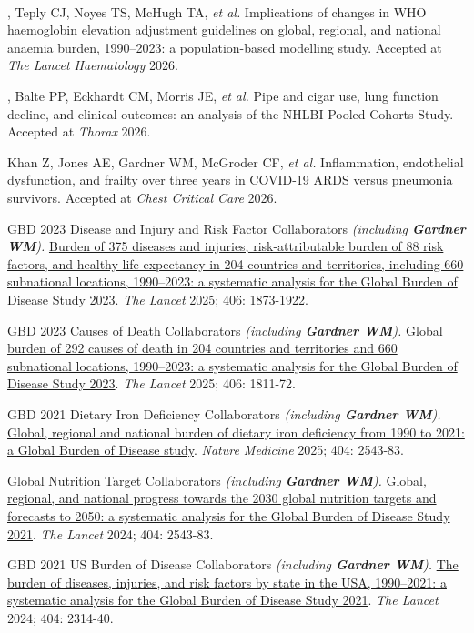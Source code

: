 \documentclass[11pt,article,oneside]{memoir}
\begin{document}
\textsuperscript{\textdagger}, Teply CJ\textsuperscript{\textdagger}, Noyes TS, McHugh TA, \emph{et al.} Implications of changes in WHO haemoglobin elevation adjustment guidelines on global, regional, and national 
anaemia burden, 1990–2023: a population-based modelling study. Accepted at \emph{The Lancet Haematology} 2026.

, Balte PP, Eckhardt CM, Morris JE, \emph{et al.} Pipe and cigar use, lung function decline, and clinical outcomes: an analysis of the NHLBI Pooled Cohorts Study. Accepted at \emph{Thorax} 2026.

\ind Khan Z, Jones AE, {\minbold Gardner WM}, McGroder CF, \emph{et al.} Inflammation, endothelial dysfunction, and frailty over three years in COVID-19 ARDS versus pneumonia survivors. Accepted at \emph{Chest Critical Care} 2026.

\ind GBD 2023 Disease and Injury and Risk Factor Collaborators \emph{(including \textbf{Gardner WM}).} \href{https://doi.org/10.1016/S0140-6736(25)01637-X}{Burden of 375 diseases and injuries, risk-attributable burden of 88 risk factors, and healthy life 
expectancy in 204 countries and territories, including 660 subnational locations, 1990–2023: a systematic analysis for the Global Burden of Disease Study 2023}. \emph{The Lancet} 2025; 406: 1873-1922. 

\ind GBD 2023 Causes of Death Collaborators \emph{(including \textbf{Gardner WM}).} \href{https://doi.org/10.1016/S0140-6736(25)01917-8}{Global burden of 292 causes of death in 204 countries and territories and 660 subnational locations, 1990–2023: a 
systematic analysis for the Global Burden of Disease Study 2023}. \emph{The Lancet} 2025; 406: 1811-72. 

\ind GBD 2021 Dietary Iron Deficiency Collaborators \emph{(including \textbf{Gardner WM}).} \href{https://doi.org/10.1038/s41591-025-03624-8}{Global, regional and national burden of dietary iron deficiency from 1990 to 2021: a Global Burden of 
Disease study}. \emph{Nature Medicine} 2025; 404: 2543-83. 

\ind Global Nutrition Target Collaborators \emph{(including \textbf{Gardner WM}).} \href{https://doi.org/10.1016/S0140-6736(24)01821-X}{Global, regional, and national progress towards the 2030 global nutrition targets and forecasts to 2050: a systematic 
analysis for the Global Burden of Disease Study 2021}. \emph{The Lancet} 2024; 404: 2543-83. 

\ind GBD 2021 US Burden of Disease Collaborators \emph{(including \textbf{Gardner WM}).} \href{https://doi.org/10.1016/S0140-6736(24)01446-6}{The burden of diseases, injuries, and risk factors by state in the USA, 1990–2021: a systematic analysis for 
the Global Burden of Disease Study 2021}. \emph{The Lancet} 2024; 404: 2314-40. 
\end{document}
